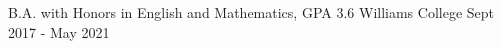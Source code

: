 \begin{cventries}
  \cventry
    {B.A. with Honors in English and Mathematics, GPA 3.6}
    {Williams College}
    {}
    {Sept 2017 - May 2021}
    {
    }
\end{cventries}
